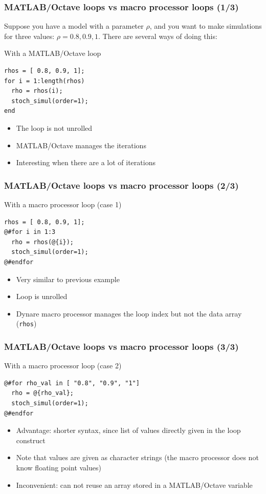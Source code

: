 \documentclass{beamer}
\begin{document}
\begin{frame}[fragile=singleslide]
  \frametitle{MATLAB/Octave loops vs macro processor loops (1/3)}
  Suppose you have a model with a parameter $\rho$, and you want to make
  simulations for three values: $\rho = 0.8, 0.9, 1$. There are
  several ways of doing this:
  \begin{block}{With a MATLAB/Octave loop}
\begin{verbatim}
rhos = [ 0.8, 0.9, 1];
for i = 1:length(rhos)
  rho = rhos(i);
  stoch_simul(order=1);
end
\end{verbatim}
  \end{block}
  \begin{itemize}
  \item The loop is not unrolled
  \item MATLAB/Octave manages the iterations
  \item Interesting when there are a lot of iterations
  \end{itemize}
\end{frame}

\begin{frame}[fragile=singleslide]
  \frametitle{MATLAB/Octave loops vs macro processor loops (2/3)}
  \begin{block}{With a macro processor loop (case 1)}
\begin{verbatim}
rhos = [ 0.8, 0.9, 1];
@#for i in 1:3
  rho = rhos(@{i});
  stoch_simul(order=1);
@#endfor
\end{verbatim}
  \end{block}
  \begin{itemize}
  \item Very similar to previous example
  \item Loop is unrolled
  \item Dynare macro processor manages the loop index but not the data array (\texttt{rhos})
  \end{itemize}
\end{frame}

\begin{frame}[fragile=singleslide]
  \frametitle{MATLAB/Octave loops vs macro processor loops (3/3)}
  \begin{block}{With a macro processor loop (case 2)}
\begin{verbatim}
@#for rho_val in [ "0.8", "0.9", "1"]
  rho = @{rho_val};
  stoch_simul(order=1);
@#endfor
\end{verbatim}
  \end{block}
  \begin{itemize}
  \item Advantage: shorter syntax, since list of values directly given in the loop construct
  \item Note that values are given as character strings (the macro processor does not
    know floating point values)
  \item Inconvenient: can not reuse an array stored in a MATLAB/Octave variable
  \end{itemize}
\end{frame}
\end{document}

